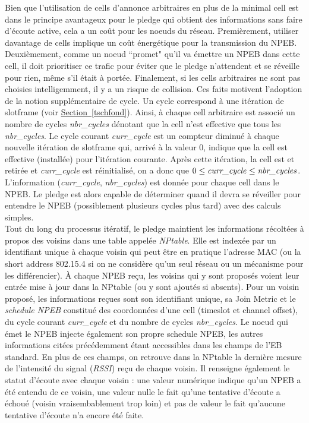 \documentclass[]{report}
\newcommand{\wordlink}[2]{\hyperref[#2]{#1~\ref{#2}}}
\begin{document}
Bien que l'utilisation de cells d'annonce arbitraires en plus de la minimal cell est dans le principe avantageux pour le pledge qui obtient des informations sans faire d'écoute active, cela a un coût pour les noeuds du réseau. Premièrement, utiliser davantage de cells implique un coût énergétique pour la transmission du NPEB. Deuxièmement, comme un noeud ``promet" qu'il va émettre un NPEB dans cette cell, il doit prioritiser ce trafic pour éviter que le pledge n'attendent et se réveille pour rien, même s'il était à portée. Finalement, si les cells arbitraires ne sont pas choisies intelligemment, il y a un risque de collision. Ces faits motivent l'adoption de la notion supplémentaire de cycle. Un cycle correspond à une itération de slotframe (voir \wordlink{Section}{tschfond}). Ainsi, à chaque cell arbitraire est associé un nombre de cycles \textit{nbr\_cycles} dénotant que la cell n'est effective  que tous les \textit{nbr\_cycles}. Le cycle courant \textit{curr\_cycle} est un compteur diminué à chaque nouvelle itération de slotframe qui, arrivé à la valeur 0, indique que la cell est effective (installée) pour l'itération courante. Après cette itération, la cell est et retirée et \textit{curr\_cycle} est réinitialisé, on a donc que $0 \leq \text{\textit{curr\_cycle}} \leq \text{\textit{nbr\_cycles}}$. L'information (\textit{curr\_cycle}, \textit{nbr\_cycles}) est donnée pour chaque cell dans le NPEB. Le pledge est alors capable de déterminer quand il devra se réveiller pour entendre le NPEB (possiblement plusieurs cycles plus tard) avec des calculs simples.\\

Tout du long du processus itératif, le pledge maintient les informations récoltées à propos des voisins dans une table appelée \textit{NPtable}. Elle est indexée par un identifiant unique à chaque voisin qui peut être en pratique l'adresse MAC (ou la short address 802.15.4 si on ne considère qu'un seul réseau ou un mécanisme pour les différencier). À chaque NPEB reçu, les voisins qui y sont proposés voient leur entrée mise à jour dans la NPtable (ou y sont ajoutés si absents). Pour un voisin proposé, les informations reçues sont son identifiant unique, sa Join Metric et le \textit{schedule NPEB} constitué des coordonnées d'une cell (timeslot et channel offset), du cycle courant \textit{curr\_cycle} et du nombre  de cycles \textit{nbr\_cycles}. Le noeud qui émet le NPEB injecte également son propre schedule NPEB, les autres informations citées précédemment étant accessibles dans les champs de l'EB standard. En plus de ces champs, on retrouve dans la NPtable la dernière mesure de l'intensité du signal (\textit{RSSI}) reçu de chaque voisin. Il renseigne également le statut d'écoute avec chaque voisin : une valeur numérique indique qu'un NPEB a été entendu de ce voisin, une valeur nulle le fait qu'une tentative d'écoute a échoué (voisin vraisembablement trop loin) et pas de valeur le fait qu'aucune tentative d'écoute n'a encore été faite.
\vspace{0.5cm}
\end{document}
